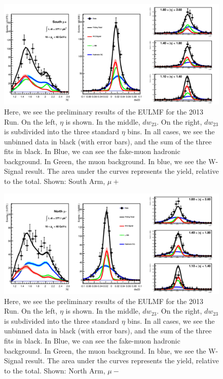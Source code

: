 \begin{figure}
  \centering
  \includegraphics[width=\linewidth]{./figures/prelim_full_maxlikefit_a0q1.jpg}
  \caption{
    Here, we see the preliminary results of the EULMF for the 2013 Run. On the
    left, $\eta$ is shown. In the middle, $dw_{23}$. On the right, $dw_{23}$ is
    subdivided into the three standard $\eta$ bins. In all cases, we see the
    unbinned data in black (with error bars), and the sum of the three fits in
    black. In Blue, we can see the fake-muon hadronic background. In Green, the
    muon background. In blue, we see the W-Signal result. The area under the
    curves represents the yield, relative to the total.  Shown: South Arm,
    $\mu+$~\cite{Seidl2014a}
  }
  \label{fig:maxlikefit_a0q1}
\end{figure}

\begin{figure}
  \centering
  \includegraphics[width=\linewidth]{./figures/prelim_full_maxlikefit_a1q0.jpg}
  \caption{
    Here, we see the preliminary results of the EULMF for the 2013 Run. On the
    left, $\eta$ is shown. In the middle, $dw_{23}$. On the right, $dw_{23}$ is
    subdivided into the three standard $\eta$ bins. In all cases, we see the
    unbinned data in black (with error bars), and the sum of the three fits in
    black. In Blue, we can see the fake-muon hadronic background. In Green, the
    muon background. In blue, we see the W-Signal result. The area under the
    curves represents the yield, relative to the total.  Shown: North Arm,
    $\mu-$~\cite{Seidl2014a}
  }
  \label{fig:maxlikefit_a1q0}
\end{figure}


